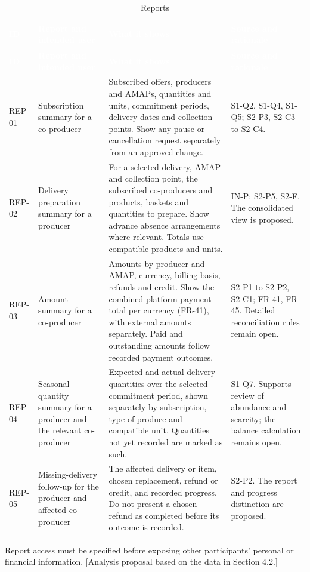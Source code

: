 \documentclass[11pt,a4paper]{article}
\begin{document}
{\footnotesize
\begin{longtable}{>{\raggedright\arraybackslash\hspace{0pt}}p{}>{\raggedright\arraybackslash\hspace{0pt}}p{}>{\raggedright\arraybackslash\hspace{0pt}}p{}>{\raggedright\arraybackslash\hspace{0pt}}p{}}
\caption{Reports}\\
\rowcolor{hdr}\textcolor{white}{\textbf{ID}} & \textcolor{white}{\textbf{Report and intended user}} & \textcolor{white}{\textbf{What it shows}} & \textcolor{white}{\textbf{Source and rationale}} \\ \endfirsthead
\rowcolor{hdr}\textcolor{white}{\textbf{ID}} & \textcolor{white}{\textbf{Report and intended user}} & \textcolor{white}{\textbf{What it shows}} & \textcolor{white}{\textbf{Source and rationale}} \\ \endhead
REP-01 & Subscription summary for a co-producer & Subscribed offers, producers and AMAPs, quantities and units, commitment periods, delivery dates and collection points. Show any pause or cancellation request separately from an approved change. & S1-Q2, S1-Q4, S1-Q5; S2-P3, S2-C3 to S2-C4. \\ \hline
REP-02 & Delivery preparation summary for a producer & For a selected delivery, AMAP and collection point, the subscribed co-producers and products, baskets and quantities to prepare. Show advance absence arrangements where relevant. Totals use compatible products and units. & IN-P; S2-P5, S2-F. The consolidated view is proposed. \\ \hline
REP-03 & Amount summary for a co-producer & Amounts by producer and AMAP, currency, billing basis, refunds and credit. Show the combined platform-payment total per currency (FR-41), with external amounts separately. Paid and outstanding amounts follow recorded payment outcomes. & S2-P1 to S2-P2, S2-C1; FR-41, FR-45. Detailed reconciliation rules remain open. \\ \hline
REP-04 & Seasonal quantity summary for a producer and the relevant co-producer & Expected and actual delivery quantities over the selected commitment period, shown separately by subscription, type of produce and compatible unit. Quantities not yet recorded are marked as such. & S1-Q7. Supports review of abundance and scarcity; the balance calculation remains open. \\ \hline
REP-05 & Missing-delivery follow-up for the producer and affected co-producer & The affected delivery or item, chosen replacement, refund or credit, and recorded progress. Do not present a chosen refund as completed before its outcome is recorded. & S2-P2. The report and progress distinction are proposed. \\ \hline
\end{longtable}}
Report access must be specified before exposing other participants' personal or financial information. [Analysis proposal based on the data in Section 4.2.]
\end{document}
